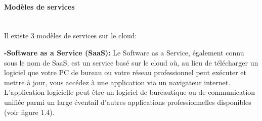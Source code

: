 \paragraph{\selectfont\Large Modèles de services }
\texttt{}\\[0.2cm]
Il existe 3 modèles de services sur le cloud:\\[0.1cm]
\par \noindent \textbf{\Large -Software as a Service (SaaS): }Le Software as a Service, également connu sous le nom de SaaS, est un service basé sur le cloud où, au lieu de télécharger un logiciel que votre PC de bureau ou votre réseau professionnel peut exécuter et mettre à jour, vous accédez à une application via un navigateur internet. L'application logicielle peut être un logiciel de bureautique ou de communication unifiée parmi un large éventail d'autres applications professionnelles disponibles\cite{3} (voir figure 1.4).

